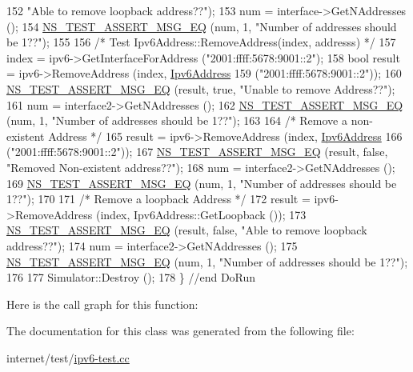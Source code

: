 \begin{DoxyCode}
152                          \textcolor{stringliteral}{"Able to remove loopback address??"});
153   num = interface->GetNAddresses ();
154   \hyperlink{group__testing_ga2a9d78cffb3db8e867c35fff0b698cf5}{NS\_TEST\_ASSERT\_MSG\_EQ} (num, 1, \textcolor{stringliteral}{"Number of addresses should be 1??"});
155 
156   \textcolor{comment}{/* Test Ipv6Address::RemoveAddress(index, addresss) */}
157   index = ipv6->GetInterfaceForAddress (\textcolor{stringliteral}{"2001:ffff:5678:9001::2"});
158   \textcolor{keywordtype}{bool} result = ipv6->RemoveAddress (index, \hyperlink{classns3_1_1Ipv6Address}{Ipv6Address} 
159                                      (\textcolor{stringliteral}{"2001:ffff:5678:9001::2"}));
160   \hyperlink{group__testing_ga2a9d78cffb3db8e867c35fff0b698cf5}{NS\_TEST\_ASSERT\_MSG\_EQ} (result, \textcolor{keyword}{true}, \textcolor{stringliteral}{"Unable to remove Address??"});
161   num = interface2->GetNAddresses ();
162   \hyperlink{group__testing_ga2a9d78cffb3db8e867c35fff0b698cf5}{NS\_TEST\_ASSERT\_MSG\_EQ} (num, 1, \textcolor{stringliteral}{"Number of addresses should be 1??"});
163 
164   \textcolor{comment}{/* Remove a non-existent Address */}
165   result = ipv6->RemoveAddress (index, \hyperlink{classns3_1_1Ipv6Address}{Ipv6Address}  
166                                 (\textcolor{stringliteral}{"2001:ffff:5678:9001::2"}));
167   \hyperlink{group__testing_ga2a9d78cffb3db8e867c35fff0b698cf5}{NS\_TEST\_ASSERT\_MSG\_EQ} (result, \textcolor{keyword}{false}, \textcolor{stringliteral}{"Removed Non-existent address??"});
168   num = interface2->GetNAddresses ();
169   \hyperlink{group__testing_ga2a9d78cffb3db8e867c35fff0b698cf5}{NS\_TEST\_ASSERT\_MSG\_EQ} (num, 1, \textcolor{stringliteral}{"Number of addresses should be 1??"});
170  
171   \textcolor{comment}{/* Remove a loopback Address */}
172   result = ipv6->RemoveAddress (index, Ipv6Address::GetLoopback ());
173   \hyperlink{group__testing_ga2a9d78cffb3db8e867c35fff0b698cf5}{NS\_TEST\_ASSERT\_MSG\_EQ} (result, \textcolor{keyword}{false}, \textcolor{stringliteral}{"Able to remove loopback address??"});
174   num = interface2->GetNAddresses ();
175   \hyperlink{group__testing_ga2a9d78cffb3db8e867c35fff0b698cf5}{NS\_TEST\_ASSERT\_MSG\_EQ} (num, 1, \textcolor{stringliteral}{"Number of addresses should be 1??"});
176 
177   Simulator::Destroy ();
178 \} \textcolor{comment}{//end DoRun}
\end{DoxyCode}


Here is the call graph for this function\+:




The documentation for this class was generated from the following file\+:\begin{DoxyCompactItemize}
\item 
internet/test/\hyperlink{ipv6-test_8cc}{ipv6-\/test.\+cc}\end{DoxyCompactItemize}
